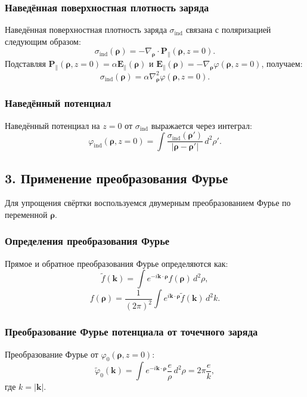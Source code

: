\documentclass{article}
\begin{document}
\subsubsection*{Наведённая поверхностная плотность заряда}

Наведённая поверхностная плотность заряда \( \sigma_{\text{ind}} \) связана с поляризацией следующим образом:
\[
\sigma_{\text{ind}}(\bm{\rho}) = -\nabla_{\bm{\rho}} \cdot \mathbf{P}_{\parallel}(\bm{\rho}, z = 0).
\]
Подставляя \( \mathbf{P}_{\parallel}(\bm{\rho}, z = 0) = \alpha \mathbf{E}_{\parallel}(\bm{\rho}) \) и \( \mathbf{E}_{\parallel}(\bm{\rho}) = -\nabla_{\bm{\rho}} \varphi(\bm{\rho}, z = 0) \), получаем:
\[
\sigma_{\text{ind}}(\bm{\rho}) = \alpha \nabla_{\bm{\rho}}^2 \varphi(\bm{\rho}, z = 0).
\]

\subsubsection*{Наведённый потенциал}

Наведённый потенциал на \( z = 0 \) от \( \sigma_{\text{ind}} \) выражается через интеграл:
\[
\varphi_{\text{ind}}(\bm{\rho}, z = 0) = \int \frac{\sigma_{\text{ind}}(\bm{\rho}')}{|\bm{\rho} - \bm{\rho}'|} \, d^2 \rho'.
\]

\subsection*{3. Применение преобразования Фурье}

Для упрощения свёртки воспользуемся двумерным преобразованием Фурье по переменной \( \bm{\rho} \).

\subsubsection*{Определения преобразования Фурье}

Прямое и обратное преобразования Фурье определяются как:
\[
\tilde{f}(\bm{k}) = \int e^{-i \bm{k} \cdot \bm{\rho}} f(\bm{\rho}) \, d^2 \rho,
\]
\[
f(\bm{\rho}) = \frac{1}{(2\pi)^2} \int e^{i \bm{k} \cdot \bm{\rho}} \tilde{f}(\bm{k}) \, d^2 k.
\]

\subsubsection*{Преобразование Фурье потенциала от точечного заряда}

Преобразование Фурье от \( \varphi_0(\bm{\rho}, z = 0) \):
\[
\tilde{\varphi}_0(\bm{k}) = \int e^{-i \bm{k} \cdot \bm{\rho}} \frac{e}{\rho} \, d^2 \rho = 2\pi \frac{e}{k},
\]
где \( k = |\bm{k}| \).
\end{document}
